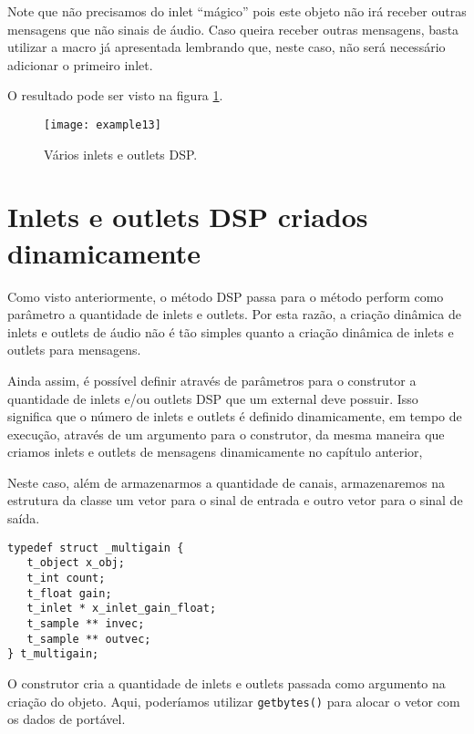 Note que não precisamos do inlet ``mágico'' pois este objeto não irá receber
outras mensagens que não sinais de áudio.
Caso queira receber outras mensagens, basta utilizar a macro já apresentada
lembrando que, neste caso, não será necessário adicionar o primeiro inlet.

O resultado pode ser visto na figura \ref{fig:varios-inlets-outlets}.

\begin{figure}[h!]
\centering
\texttt{[image: example13]}
\caption{Vários inlets e outlets DSP.}
\label{fig:varios-inlets-outlets}
\end{figure}

\section{Inlets e outlets DSP criados dinamicamente}

Como visto anteriormente, o método DSP passa para o método perform como parâmetro
a quantidade de inlets e outlets.
Por esta razão, a criação dinâmica de inlets e outlets de áudio não é tão simples
quanto a criação dinâmica de inlets e outlets para mensagens.

Ainda assim, é possível definir através de parâmetros para o construtor a
quantidade de inlets e/ou outlets DSP que um external deve possuir.
Isso significa que o número de inlets e outlets é definido dinamicamente,
em tempo de execução, através de um argumento para o construtor, da mesma
maneira que criamos inlets e outlets de mensagens dinamicamente no
capítulo anterior, 

Neste caso, além de armazenarmos a quantidade de canais, armazenaremos na
estrutura da classe um vetor para o sinal de entrada e outro vetor para o sinal
de saída.

\begin{lstlisting}[caption=Estrutura da classe para inlets e outlets DSP dinâmicos]
typedef struct _multigain {
   t_object x_obj;
   t_int count;
   t_float gain;
   t_inlet * x_inlet_gain_float;
   t_sample ** invec;
   t_sample ** outvec;
} t_multigain;
\end{lstlisting}

O construtor cria a quantidade de inlets e outlets passada
como argumento na criação do objeto.
Aqui, poderíamos utilizar \texttt{getbytes()} para alocar o vetor com os dados
de portável.

